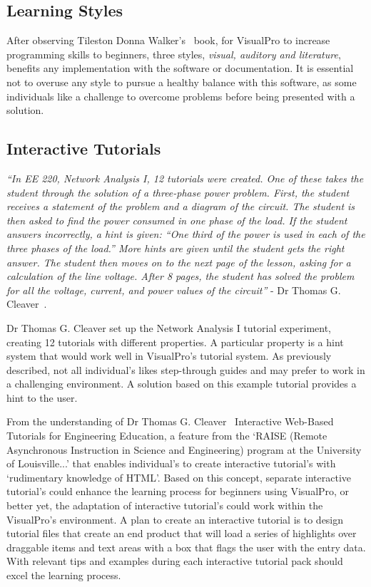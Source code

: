 \documentclass[12pt]{report} %
\begin{document}
		\subsection{Learning Styles}
			After observing Tileston Donna Walker's~\cite{tileston_donna_walker_10_2011} book, for VisualPro to increase programming skills to beginners, three styles, \textit{visual, auditory and literature}, benefits any implementation with the software or documentation. It is essential not to overuse any style to pursue a healthy balance with this software, as some individuals like a challenge to overcome problems before being presented with a solution. 

		\subsection{Interactive Tutorials}
			\begin{center}
				\textit{``In EE 220, Network Analysis I, 12 tutorials were created. One of these takes the student through the solution of a three-phase power problem. First, the student receives a statement of the problem and a diagram of the circuit. The student is then asked to find the power consumed in one phase of the load. If the student answers incorrectly, a hint is given: “One third of the power is used in each of the three phases of the load.” More hints are given until the student gets the right answer. The student then moves on to the next page of the lesson, asking for a calculation of the line voltage. After 8 pages, the student has solved the	problem for all the voltage, current, and power values of the circuit''} - Dr Thomas G. Cleaver~\cite{cleaver_interactive_1999}.
			\end{center}

			Dr Thomas G. Cleaver set up the Network Analysis I tutorial experiment, creating 12 tutorials with different properties. A particular property is a hint system that would work well in VisualPro's tutorial system. As previously described, not all individual's likes step-through guides and may prefer to work in a challenging environment. A solution based on this example tutorial provides a hint to the user.
			
			From the understanding of Dr Thomas G. Cleaver~\cite{cleaver_interactive_1999} Interactive Web-Based Tutorials for Engineering Education, a feature from the `RAISE (Remote Asynchronous Instruction in Science and Engineering) program at the University of Louisville...' that enables individual's to create interactive tutorial's with `rudimentary knowledge of HTML'. Based on this concept, separate interactive tutorial's could enhance the learning process for beginners using VisualPro, or better yet, the adaptation of interactive tutorial's could work within the VisualPro's environment. A plan to create an interactive tutorial is to design tutorial files that create an end product that will load a series of highlights over draggable items and text areas with a box that flags the user with the entry data. With relevant tips and examples during each interactive tutorial pack should excel the learning process.
\end{document}
